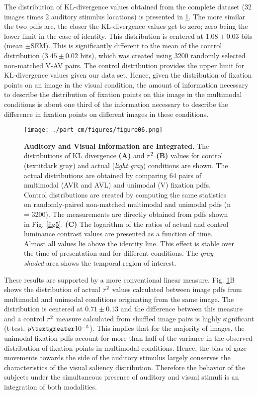 The distribution of KL-divergence values obtained from the complete dataset
(32 images times 2 auditory stimulus locations) is presented in \ref{fig6}.
The more similar the two pdfs are, the closer the KL-divergence values get
to zero; zero being the lower limit in the case of identity. This
distribution is centered at $1.08 \pm 0.03$ bits (mean $\pm$SEM). This is
significantly different to the mean of the control distribution ($3.45 \pm
0.02$ bits), which was created using 3200 randomly selected non-matched
V-AV pairs. The control distribution provides the upper limit for
KL-divergence values given our data set. Hence, given the distribution of
fixation points on an image in the visual condition, the amount of
information necessary to describe the distribution of fixation points on
this image in the multimodal conditions is about one third of the
information necessary to describe the difference in fixation points on
different images in these conditions. 

\begin{SCfigure}[][!htb]
\texttt{[image: ./part\_cm/figures/figure06.png]} 
\caption[Auditory and Visual Information are Integrated.]{ \textbf{Auditory
and Visual Information are Integrated.} The distributions of KL divergence
\textbf{(A)} and $r\textsuperscript{2}$ \textbf{(B)} values for control
(textit{dark gray}) and actual (\textit{light gray}) conditions are shown.
The actual distributions are obtained by comparing 64 pairs of multimodal
(AVR and AVL) and unimodal (V) fixation pdfs. Control distributions are
created by computing the same statistics on randomly-paired non-matched
multimodal and unimodal pdfs (n = 3200). The measurements are directly
obtained from pdfs shown in Fig. \ref{fig5}. \textbf{(C)} The logarithm of
the ratios of actual and control luminance contrast values are presented as
a function of time. Almost all values lie above the identity line. This
effect is stable over the time of presentation and for different
conditions. The \textit{gray shaded} area shows the temporal region of
interest.} \label{fig6}\end{SCfigure}

These results are supported by a more conventional linear measure. Fig.
\ref{fig6}B shows the distribution of actual $r\textsuperscript{2}$ values
calculated between image pdfs from multimodal and unimodal conditions
originating from the same image. The distribution is centered at
$0.71\pm0.13$ and the difference between this measure and a control
$r\textsuperscript{2}$ measure calculated from shuffled image pairs is
highly significant (t-test, $p \textgreater 10^{-5}$). This implies that
for the majority of images, the unimodal fixation pdfs account for more
than half of the variance in the observed distribution of fixation points
in multimodal conditions. Hence, the bias of gaze movements towards the
side of the auditory stimulus largely conserves the characteristics of the
visual saliency distribution. Therefore the behavior of the subjects under
the simultaneous presence of auditory and visual stimuli is an integration
of both modalities. 

